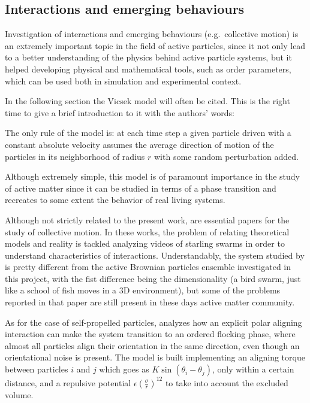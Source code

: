 \documentclass[../../master_thesis_np.tex]{subfiles}
\begin{document}
	\subsection{Interactions and emerging behaviours}
	Investigation of interactions and emerging behaviours (e.g.\ collective motion) is an extremely important topic in the field of active particles, since it not only lead to a better understanding of the physics behind active particle systems, but it helped developing physical and mathematical tools, such as order parameters, which can be used both in simulation and experimental context. 
	
	In the following section the Vicsek model will often be cited. 
	This is the right time to give a brief introduction to it with the authors' words:
	 \begin{displayquote}
		The only rule of the model is: at each time step a given particle driven with a constant absolute velocity assumes the average direction of motion of the particles in its neighborhood of radius $r$ with some random perturbation added.\cite{vicsek_novel_1995}
	 \end{displayquote}
	Although extremely simple, this model is of paramount importance in the study of active matter since it can be studied in terms of a phase transition and recreates to some extent the behavior of real living systems.
	
	Although not strictly related to the present work, \cite{cavagna_empirical_2010, ballerini_interaction_2008} are essential papers for the study of collective motion.
	In these works, the problem of relating theoretical models and reality is tackled analyzing videos of starling swarms in order to understand characteristics of interactions. %
	Understandably, the system studied by \citeauthor{cavagna_empirical_2010, ballerini_interaction_2008} is pretty different from the active Brownian particles ensemble investigated in this project, with the fist difference being the dimensionality (a bird swarm, just like a school of fish moves in a 3D environment), but some of the problems reported in that paper are still present in these days active matter community.
	
	As for the case of self-propelled particles, \cite{martin-gomez_collective_2018} analyzes how an explicit polar aligning interaction can make the system transition to an ordered flocking phase, where almost all particles align their orientation in the same direction, even though an orientational noise is present. 
	The model is built implementing an aligning torque between particles $i$ and $j$ which goes as $K \sin{(\theta_{i} - \theta_{j})}$, only within a certain distance, and a repulsive potential $\epsilon \left(\frac{\sigma}{r}\right)^{12}$ to take into account the excluded volume.
	
\end{document}
